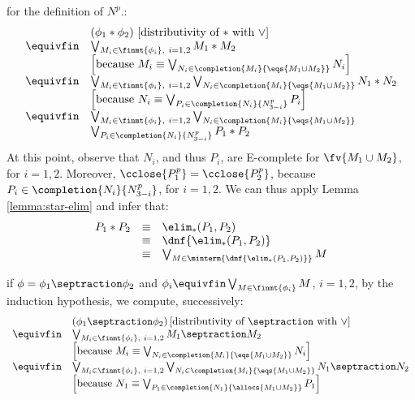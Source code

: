 {\begin{compactitem}
{    for the definition of $N^p$.}:
  \[\begin{array}{rl}
  & (\phi_1 * \phi_2) \text{ [distributivity of $*$ with $\vee$]} \\
  \equivfin & \bigvee_{M_i \in \finmt{\phi_i},~ i=1,2} M_1 * M_2 \\
  & \left[\text{because } M_i \equiv \bigvee_{N_i \in \completion{M_i}{\eqs{M_1 \cup M_2}}} N_i\right] \\
  \equivfin & \bigvee_{M_i \in \finmt{\phi_i},~ i=1,2} \bigvee_{N_i \in \completion{M_i}{\eqs{M_1 \cup M_2}}} N_1 * N_2 \\
  & \left[\text{because } N_i \equiv \bigvee_{P_i \in \completion{N_i}{N_{3-i}^p}} P_i\right] \\
  \equivfin & \bigvee_{M_i \in \finmt{\phi_i},~ i=1,2} \bigvee_{N_i \in \completion{M_i}{\eqs{M_1 \cup M_2}}} \\ 
  & \bigvee_{P_i \in \completion{N_i}{N_{3-i}^p}} P_1 * P_2
  \end{array}\]
  At this point, observe that $N_i$, and thus $P_i$, are E-complete
  for $\fv{M_1 \cup M_2}$, for $i=1,2$. Moreover, $\cclose{P_1^p} =
  \cclose{P_2^p}$, because $P_i \in \completion{N_i}{N_{3-i}^p}$, for
  $i=1,2$. We can thus apply Lemma \ref{lemma:star-elim} and infer
  that:
  \[\begin{array}{rcl}
  P_1 * P_2 & \equiv & \elim_*(P_1,P_2) \\ 
  & \equiv & \dnf{\elim_*(P_1,P_2)} \\ 
  & \equiv & \bigvee_{M \in
    \minterm{\dnf{\elim_*(P_1,P_2)}}} M
  \end{array}\]
\item if $\phi = \phi_1 \septraction \phi_2$ and $\phi_i \equivfin
  \bigvee_{M \in \finmt{\phi_i}} M$, $i=1,2$, by the induction
  hypothesis, we compute, successively:
  \[\begin{array}{rl}
  & (\phi_1 \septraction \phi_2) \left[\text{distributivity of } \septraction \text{ with }\vee\right] \\
  \equivfin & \bigvee_{M_i \in \finmt{\phi_i},~ i=1,2} M_1 \septraction M_2 \\
  & \left[\text{because } M_i \equiv \bigvee_{N_i \in \completion{M_i}{\eqs{M_1 \cup M_2}}} N_i\right] \\
  \equivfin & \bigvee_{M_i \in \finmt{\phi_i},~ i=1,2} \bigvee_{N_i \in \completion{M_i}{\eqs{M_1 \cup M_2}}} N_1 \septraction N_2 \\
  & \left[\text{because } N_1 \equiv \bigvee_{P_1 \in \completion{N_1}{\allocs{M_1 \cup M_2}}} P_1\right] \\

\end{array}\]
\end{compactitem}}
